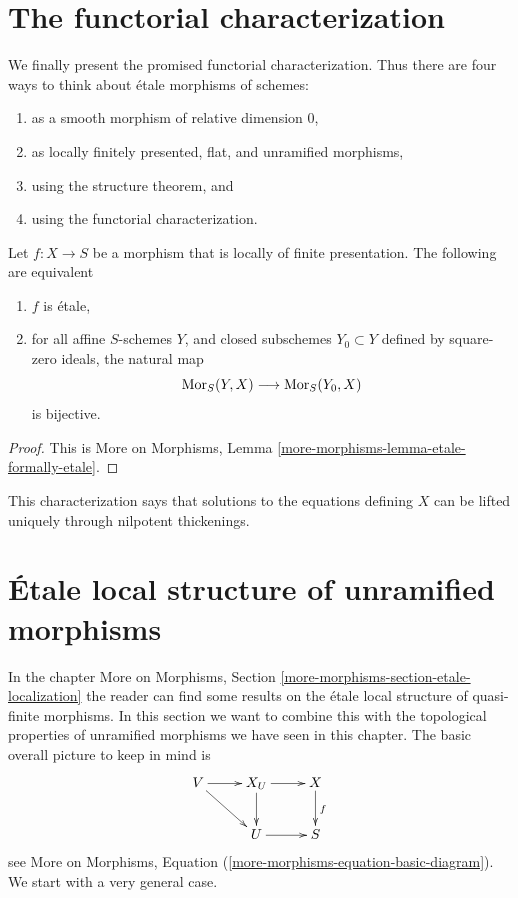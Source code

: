 \section{The functorial characterization}
\label{section-functorial-etale}

\noindent
We finally present the promised functorial characterization.
Thus there are four ways to think about \'etale morphisms of schemes:
\begin{enumerate}
\item as a smooth morphism of relative dimension $0$,
\item as locally finitely presented, flat, and unramified morphisms,
\item using the structure theorem, and
\item using the functorial characterization.
\end{enumerate}

\begin{theorem}
\label{theorem-formally-etale}
Let $f : X \to S$ be a morphism that is locally of finite presentation.
The following are equivalent
\begin{enumerate}
\item $f$ is \'etale,
\item for all affine $S$-schemes $Y$, and closed subschemes $Y_0 \subset Y$
defined by square-zero ideals, the natural map
$$
\mathop{\mathrm{Mor}}\nolimits_S(Y, X) \longrightarrow \mathop{\mathrm{Mor}}\nolimits_S(Y_0, X)
$$
is bijective.
\end{enumerate}
\end{theorem}

\begin{proof}
This is
More on Morphisms, Lemma \ref{more-morphisms-lemma-etale-formally-etale}.
\end{proof}

\noindent
This characterization says that solutions to the equations defining $X$ can
be lifted uniquely through nilpotent thickenings.



\section{\'Etale local structure of unramified morphisms}
\label{section-unramified-etale-local}

\noindent
In the chapter
More on Morphisms, Section \ref{more-morphisms-section-etale-localization}
the reader can find some results on the \'etale local structure of
quasi-finite morphisms. In this section we want to combine this
with the topological properties of unramified morphisms we have seen
in this chapter. The basic overall picture to keep in mind is
$$
\xymatrix{
V \ar[r] \ar[dr] & X_U \ar[d] \ar[r] & X \ar[d]^f \\
& U \ar[r] & S
}
$$
see
More on Morphisms, Equation (\ref{more-morphisms-equation-basic-diagram}).
We start with a very general case.

